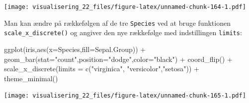 \documentclass[
]{book}
\newenvironment{Shaded}{\begin{snugshade}}{\end{snugshade}}
\newcommand{\AttributeTok}[1]{\textcolor[rgb]{0.77,0.63,0.00}{#1}}
\newcommand{\CommentTok}[1]{\textcolor[rgb]{0.56,0.35,0.01}{\textit{#1}}}
\newcommand{\FunctionTok}[1]{\textcolor[rgb]{0.00,0.00,0.00}{#1}}
\newcommand{\NormalTok}[1]{#1}
\newcommand{\OtherTok}[1]{\textcolor[rgb]{0.56,0.35,0.01}{#1}}
\newcommand{\SpecialCharTok}[1]{\textcolor[rgb]{0.00,0.00,0.00}{#1}}
\newcommand{\StringTok}[1]{\textcolor[rgb]{0.31,0.60,0.02}{#1}}
\begin{document}
\begin{Shaded}
\end{Shaded}

\texttt{[image: visualisering\_22\_files/figure-latex/unnamed-chunk-164-1.pdf]}

Man kan ændre på rækkefølgen af de tre \texttt{Species} ved at bruge funktionen \texttt{scale\_x\_discrete()} og angiver den nye rækkefølge med indstillingen \texttt{limits}:

\begin{Shaded}
\begin{Highlighting}[]
\FunctionTok{ggplot}\NormalTok{(iris,}\FunctionTok{aes}\NormalTok{(}\AttributeTok{x=}\NormalTok{Species,}\AttributeTok{fill=}\NormalTok{Sepal.Group)) }\SpecialCharTok{+} 
  \FunctionTok{geom\_bar}\NormalTok{(}\AttributeTok{stat=}\StringTok{"count"}\NormalTok{,}\AttributeTok{position=}\StringTok{"dodge"}\NormalTok{,}\AttributeTok{color=}\StringTok{"black"}\NormalTok{) }\SpecialCharTok{+}
  \FunctionTok{coord\_flip}\NormalTok{() }\SpecialCharTok{+}
  \FunctionTok{scale\_x\_discrete}\NormalTok{(}\AttributeTok{limits =} \FunctionTok{c}\NormalTok{(}\StringTok{"virginica"}\NormalTok{, }\StringTok{"versicolor"}\NormalTok{,}\StringTok{"setosa"}\NormalTok{)) }\SpecialCharTok{+}
  \FunctionTok{theme\_minimal}\NormalTok{()}
\end{Highlighting}
\end{Shaded}

\texttt{[image: visualisering\_22\_files/figure-latex/unnamed-chunk-165-1.pdf]}
\end{document}
